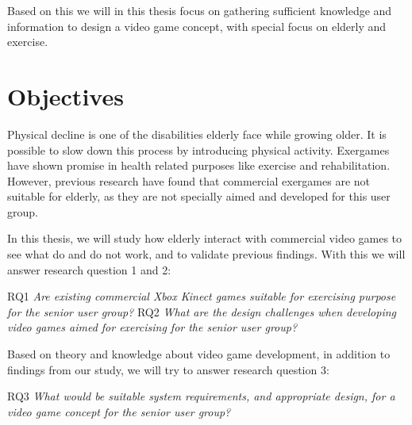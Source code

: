Based on this we will in this thesis focus on gathering sufficient knowledge and information to design a video game concept, with special focus on elderly and exercise.    

\section{Objectives}
\label{sec:researchq}
Physical decline is one of the disabilities elderly face while growing older. It is possible to slow down this process by introducing physical activity. Exergames have shown promise in health related purposes like exercise and rehabilitation. However, previous research have found that commercial exergames are not suitable for elderly, as they are not specially aimed and developed for this user group. 

In this thesis, we will study how elderly interact with commercial video games to see what do and do not work, and to validate previous findings. With this we will answer research question 1 and 2: 

RQ1 \emph{Are existing commercial Xbox Kinect games suitable for exercising purpose for the senior user group?} 
RQ2 \emph{What are the design challenges when developing video games aimed for exercising for the senior user group?}

Based on theory and knowledge about video game development, in addition to findings from our study, we will try to answer research question 3:

RQ3 \emph{What would be suitable system requirements, and appropriate design, for a video game concept for the senior user group?}

